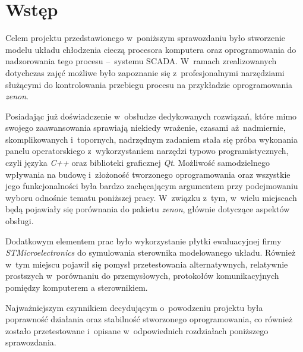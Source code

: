 \section{Wstęp}
\indent

Celem projektu przedstawionego w~poniższym sprawozdaniu było stworzenie modelu
układu chłodzenia cieczą procesora komputera oraz oprogramowania do nadzorowania
tego procesu --~systemu SCADA. W~ramach zrealizowanych dotychczas zajęć możliwe
było zapoznanie się z~profesjonalnymi narzędziami służącymi do kontrolowania
przebiegu procesu na przykładzie oprogramowania \textit{zenon}.

Posiadając już doświadczenie w~obsłudze dedykowanych rozwiązań, które mimo
swojego zaawansowania sprawiają niekiedy wrażenie, czasami aż nadmiernie,
skomplikowanych i~topornych, nadrzędnym zadaniem stała się próba wykonania
panelu operatorskiego z~wykorzystaniem narzędzi typowo programistycznych, czyli
języka \textit{C++} oraz biblioteki graficznej \textit{Qt}. Możliwość
samodzielnego wpływania na budowę i~złożoność tworzonego oprogramowania oraz
wszystkie jego funkcjonalności była bardzo zachęcającym argumentem przy
podejmowaniu wyboru odnośnie tematu poniższej pracy. W~związku z~tym, w~wielu
miejscach będą pojawiały się porównania do pakietu \textit{zenon}, głównie
dotyczące aspektów obsługi.

Dodatkowym elementem prac było wykorzystanie płytki ewaluacyjnej firmy
\textit{STMicroelectronics} do symulowania sterownika modelowanego układu.
Również w~tym miejscu pojawił się pomysł przetestowania alternatywnych,
relatywnie prostszych w~porównaniu do przemysłowych, protokołów komunikacyjnych
pomiędzy komputerem a sterownikiem.

Najważniejszym czynnikiem decydującym o~powodzeniu projektu była poprawność
działania oraz stabilność stworzonego oprogramowania, co również zostało
przetestowane i~opisane w~odpowiednich rozdziałach poniższego sprawozdania.
